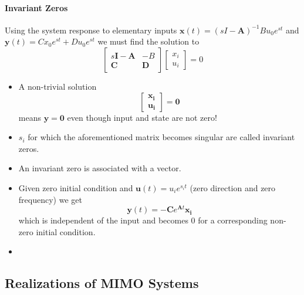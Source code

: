 \paragraph{Invariant Zeros}

Using the system response to elementary inputs $\mathbf{x}(t)=(sI-\mathbf{A})^{-1}Bu_0e^{st}$ and $\mathbf{y}(t)=Cx_0e^{st}+Du_0e^{st}$ we must find the solution to
\begin{equation*}
    \begin{bmatrix}
        s\mathbf{I}-\mathbf{A} & -B         \\
        \mathbf{C}             & \mathbf{D}
    \end{bmatrix}
    \begin{bmatrix}
        x_i \\
        u_i
    \end{bmatrix}=0
\end{equation*}



\begin{itemize}
    \item A non-trivial solution
          \begin{equation*}
              \begin{bmatrix}
                  \mathbf{x_i} \\
                  \mathbf{u_i}
              \end{bmatrix}=\mathbf{0}
          \end{equation*}
          means $\mathbf{\mathbf{y}}=\mathbf{0}$ even though input and state are not zero!
    \item $s_i$ for which the aforementioned matrix becomes singular are called invariant zeros.
    \item An invariant zero is associated with a vector.
    \item Given zero initial condition and $\mathbf{u}(t)=u_i e^{s_i t}$ (zero direction and zero frequency) we get
          \begin{equation*}
              \mathbf{y}(t)=-\mathbf{C}e^{\mathbf{A}t}\mathbf{x_i}
          \end{equation*} which is independent of the input and becomes $0$ for a corresponding non-zero initial condition.
    \item
\end{itemize}


\subsection{Realizations of MIMO Systems}
